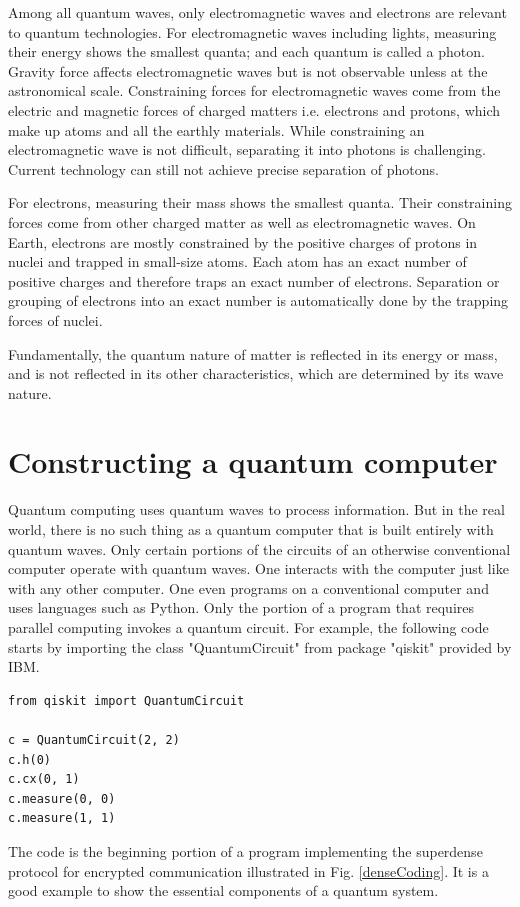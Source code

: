 \documentclass[oneside, letter, 12pt]{book}
\begin{document}
Among all quantum waves, only electromagnetic waves and electrons are relevant to quantum technologies. For electromagnetic waves including lights, measuring their energy shows the smallest quanta; and each quantum is called a photon. Gravity force affects electromagnetic waves but is not observable unless at the astronomical scale. Constraining forces for electromagnetic waves come from the electric and magnetic forces of charged matters i.e. electrons and protons, which make up atoms and all the earthly materials. While constraining an electromagnetic wave is not difficult, separating it into photons is challenging. Current technology can still not achieve precise separation of photons.

For electrons, measuring their mass shows the smallest quanta. Their constraining forces come from other charged matter as well as electromagnetic waves. On Earth, electrons are mostly constrained by the positive charges of protons in nuclei and trapped in small-size atoms. Each atom has an exact number of positive charges and therefore traps an exact number of electrons. Separation or grouping of electrons into an exact number is automatically done by the trapping forces of nuclei.

Fundamentally, the quantum nature of matter is reflected in its energy or mass, and is not reflected in its other characteristics, which are determined by its wave nature.

\section{Constructing a quantum computer}
Quantum computing uses quantum waves to process information. But in the real world, there is no such thing as a quantum computer that is built entirely with quantum waves. Only certain portions of the circuits of an otherwise conventional computer operate with quantum waves. One interacts with the computer just like with any other computer. One even programs on a conventional computer and uses languages such as Python. Only the portion of a program that requires parallel computing invokes a quantum circuit. For example, the following code starts by importing the class "QuantumCircuit" from package "qiskit" provided by IBM.
\begin{lstlisting}
from qiskit import QuantumCircuit

c = QuantumCircuit(2, 2)
c.h(0)
c.cx(0, 1)
c.measure(0, 0)
c.measure(1, 1)    
\end{lstlisting}
The code is the beginning portion of a program implementing the superdense protocol for encrypted communication illustrated in Fig. \ref{denseCoding}. It is a good example to show the essential components of a quantum system.
\end{document}
